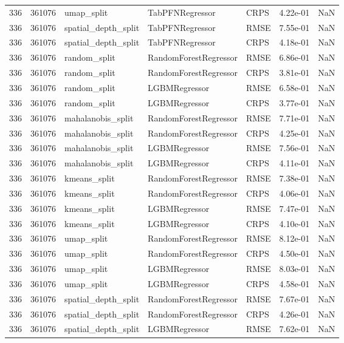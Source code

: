 \begin{tabular}{rrlllrr}
336 & 361076 & umap\_split & TabPFNRegressor & CRPS & 4.22e-01 & NaN \\
336 & 361076 & spatial\_depth\_split & TabPFNRegressor & RMSE & 7.55e-01 & NaN \\
336 & 361076 & spatial\_depth\_split & TabPFNRegressor & CRPS & 4.18e-01 & NaN \\
336 & 361076 & random\_split & RandomForestRegressor & RMSE & 6.86e-01 & NaN \\
336 & 361076 & random\_split & RandomForestRegressor & CRPS & 3.81e-01 & NaN \\
336 & 361076 & random\_split & LGBMRegressor & RMSE & 6.58e-01 & NaN \\
336 & 361076 & random\_split & LGBMRegressor & CRPS & 3.77e-01 & NaN \\
336 & 361076 & mahalanobis\_split & RandomForestRegressor & RMSE & 7.71e-01 & NaN \\
336 & 361076 & mahalanobis\_split & RandomForestRegressor & CRPS & 4.25e-01 & NaN \\
336 & 361076 & mahalanobis\_split & LGBMRegressor & RMSE & 7.56e-01 & NaN \\
336 & 361076 & mahalanobis\_split & LGBMRegressor & CRPS & 4.11e-01 & NaN \\
336 & 361076 & kmeans\_split & RandomForestRegressor & RMSE & 7.38e-01 & NaN \\
336 & 361076 & kmeans\_split & RandomForestRegressor & CRPS & 4.06e-01 & NaN \\
336 & 361076 & kmeans\_split & LGBMRegressor & RMSE & 7.47e-01 & NaN \\
336 & 361076 & kmeans\_split & LGBMRegressor & CRPS & 4.10e-01 & NaN \\
336 & 361076 & umap\_split & RandomForestRegressor & RMSE & 8.12e-01 & NaN \\
336 & 361076 & umap\_split & RandomForestRegressor & CRPS & 4.50e-01 & NaN \\
336 & 361076 & umap\_split & LGBMRegressor & RMSE & 8.03e-01 & NaN \\
336 & 361076 & umap\_split & LGBMRegressor & CRPS & 4.58e-01 & NaN \\
336 & 361076 & spatial\_depth\_split & RandomForestRegressor & RMSE & 7.67e-01 & NaN \\
336 & 361076 & spatial\_depth\_split & RandomForestRegressor & CRPS & 4.26e-01 & NaN \\
336 & 361076 & spatial\_depth\_split & LGBMRegressor & RMSE & 7.62e-01 & NaN \\

\end{tabular}
